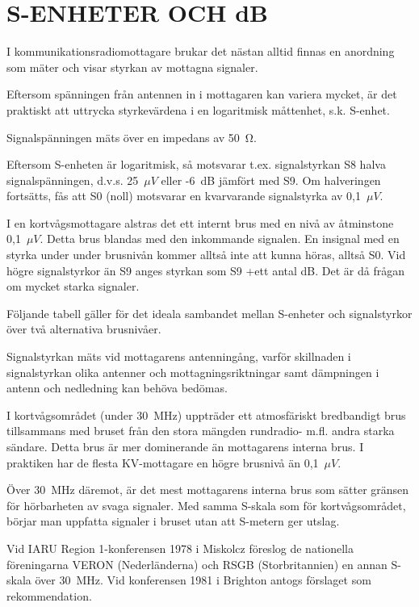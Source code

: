 \chapter{S-ENHETER OCH dB}
\label{s-enhet}

I kommunikationsradiomottagare brukar det nästan alltid finnas en
anordning som mäter och visar styrkan av mottagna signaler.

Eftersom spänningen från antennen in i mottagaren kan variera mycket,
är det praktiskt att uttrycka styrkevärdena i en logaritmisk måttenhet,
s.k. S-enhet.

Signalspänningen mäts över en impedans av 50~Ω.

Eftersom S-enheten är logaritmisk, så motsvarar t.ex. signalstyrkan
S8 halva signalspänningen, d.v.s. 25~\(\mu V\) eller -6~dB jämfört med S9. Om
halveringen fortsätts, fås att S0 (noll) motsvarar en kvarvarande
signalstyrka av 0,1~\(\mu V\).

I en kortvågsmottagare alstras det ett internt brus med en nivå av
åtminstone 0,1~\(\mu V\).  Detta brus blandas med den inkommande signalen. En
insignal med en styrka under under brusnivån kommer alltså inte att
kunna höras, alltså S0. Vid högre signalstyrkor än S9 anges styrkan
som S9 +ett antal dB. Det är då frågan om mycket starka signaler.

Följande tabell gäller för det ideala sambandet mellan S-enheter och
signalstyrkor över två alternativa brusnivåer.

Signalstyrkan mäts vid mottagarens antenningång, varför skillnaden i
signalstyrkan olika antenner och mottagningsriktningar samt dämpningen
i antenn och nedledning kan behöva bedömas.

I kortvågsområdet (under 30~MHz) uppträder ett atmosfäriskt
bredbandigt brus tillsammans med bruset från den stora mängden
rundradio- m.fl. andra starka sändare. Detta brus är mer dominerande
än mottagarens interna brus. I praktiken har de flesta KV-mottagare en
högre brusnivå än 0,1~\(\mu V\).

Över 30~MHz däremot, är det mest mottagarens interna brus som sätter
gränsen för hörbarheten av svaga signaler. Med samma S-skala som för
kortvågsområdet, börjar man uppfatta signaler i bruset utan att
S-metern ger utslag.

Vid IARU Region 1-konferensen 1978 i Miskolcz föreslog de nationella
föreningarna VERON (Nederländerna) och RSGB (Storbritannien) en annan
S-skala över 30~MHz.  Vid konferensen 1981 i Brighton antogs förslaget
som rekommendation.

